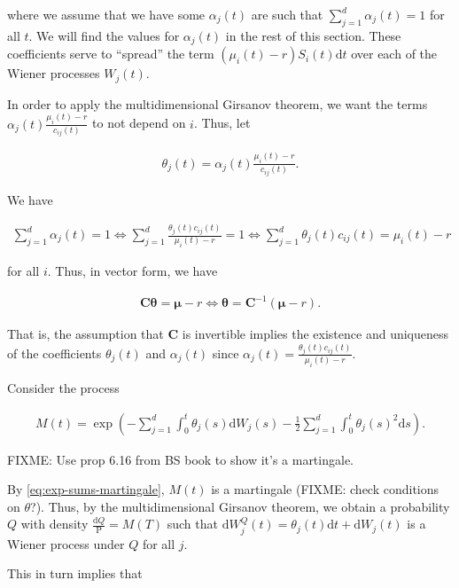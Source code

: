\documentclass[a4paper]{article}
\begin{document}
where we assume that we have some $\alpha_j(t)$ are such that $\sum_{j=1}^d \alpha_j(t) = 1$ for all $t$. We will find the values for $\alpha_j(t)$ in the rest of this section. These coefficients serve to ``spread'' the term $(\mu_i(t) - r) S_i(t) \mathrm{d}t$ over each of the Wiener processes $W_j(t)$.

In order to apply the multidimensional Girsanov theorem, we want the terms $\alpha_j(t) \frac{\mu_i(t) - r}{c_{ij}(t)}$ to not depend on $i$. Thus, let

\begin{align*}
  \theta_j(t) = \alpha_j(t) \frac{\mu_i(t) - r}{c_{ij}(t)}.
\end{align*}

We have

\begin{align*}
  \sum_{j=1}^{d} \alpha_j(t) = 1
  \iff \sum_{j=1}^{d} \frac{\theta_j(t) c_{ij}(t)}{\mu_i(t) - r} = 1
  \iff \sum_{j=1}^{d} \theta_j(t) c_{ij}(t) = \mu_i(t) - r
\end{align*}

for all $i$. Thus, in vector form, we have

\begin{align*}
  \mathbf{C} \mathbf{\theta} = \mathbf{\mu} - r
  \iff \mathbf{\theta} = \mathbf{C}^{-1} (\mathbf{\mu} - r).
\end{align*}

That is, the assumption that $\mathbf{C}$ is invertible implies the existence and uniqueness of the coefficients $\theta_j(t)$ and $\alpha_j(t)$ since $\alpha_j(t) = \frac{\theta_j(t) c_{ij}(t)}{\mu_i(t) - r}$.

Consider the process

\begin{align*}
  M(t) = \exp \left( - \sum_{j=1}^{d} \int_0^t \theta_j(s) \mathrm{d}W_j(s) - \frac{1}{2} \sum_{j=1}^{d} \int_0^t \theta_j(s)^2 \mathrm{d}s \right).
\end{align*}

FIXME: Use prop 6.16 from BS book to show it's a martingale.

By \eqref{eq:exp-sums-martingale}, $M(t)$ is a martingale (FIXME: check conditions on $\theta$?). Thus, by the multidimensional Girsanov theorem, we obtain a probability $Q$ with density $\frac{\mathrm{d}Q}{\mathrm{P}} = M(T)$ such that $\mathrm{d}W^Q_j(t) = \theta_j(t) \mathrm{d}t + \mathrm{d}W_j(t)$ is a Wiener process under $Q$ for all $j$.

This in turn implies that
\end{document}
